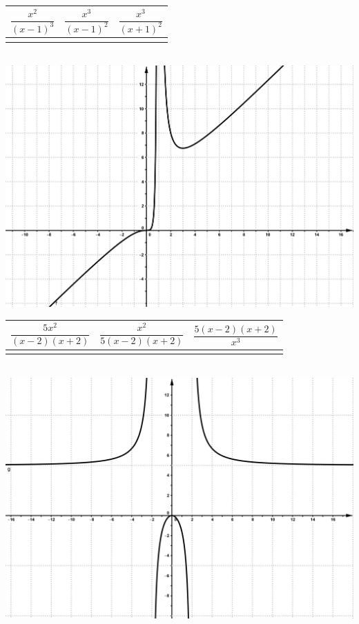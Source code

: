 \documentclass[a4paper,11pt,spanish,sans]{exam}
\newcommand{\Ts}{\rule{0pt}{2.8ex}}       %
\newcommand{\Bs}{\rule[-1.5ex]{0pt}{0pt}} %
\begin{document}
\begin{enumerate}
	\begin{minipage}{0.5\textwidth}
		\centering
		\label{mc1}
		\begin{tabular}{|c|c|c|}
			\hline
			$\dfrac{x^2}{(x-1)^3}$  & $\dfrac{x^3}{(x-1)^2}$ & $\dfrac{x^3}{(x+1)^2}$ \Ts \Bs   \\ \hline
			&   &      \\ \hline
		\end{tabular}\\
		\centering
		\includegraphics[width= 0.95\linewidth]{integradora1.png}
	\end{minipage}
	\begin{minipage}{.5\textwidth}
		\centering
		\begin{tabular}{|c|c|c|}
			\hline
			$\dfrac{5x^2}{(x-2)(x+2)}$  & $\dfrac{x^2}{5(x-2)(x+2)}$ & $\dfrac{5(x-2)(x+2)}{x^3}$ \Ts \Bs   \\ \hline
			&   &      \\ \hline
		\end{tabular}\\
		\centering
		\includegraphics[width= 0.95\linewidth]{integradora2.png}

\end{minipage}
\end{enumerate}
\end{document}
